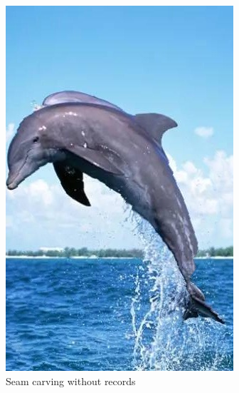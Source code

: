 \documentclass[final]{cvpr}
\begin{document}
\begin{figure}[htb]
\begin{center}
\begin{subfigure}[b]{0.24\linewidth}
    \includegraphics[width=\textwidth]{dolphin_seam_carving.jpg}
    \caption{Seam carving without records}
\end{subfigure}
\begin{subfigure}[b]{0.24\linewidth}

\end{subfigure}
\end{center}
\end{figure}
\end{document}
